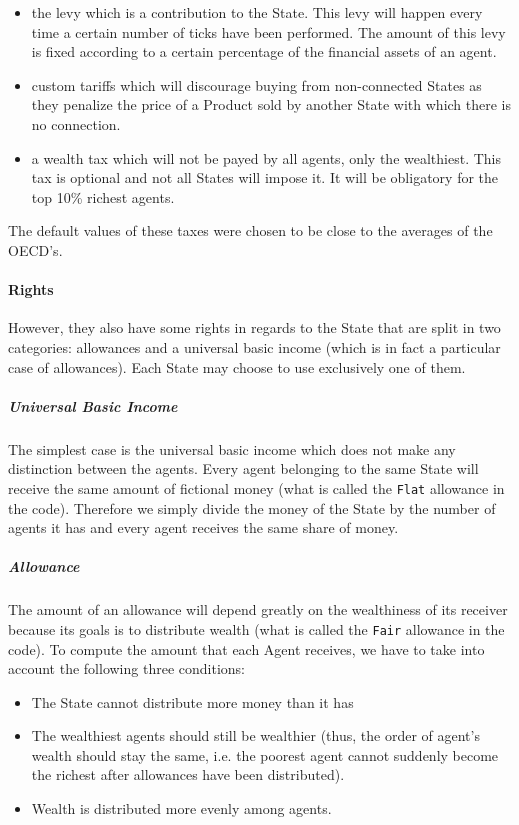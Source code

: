             \begin{itemize}
                \item the levy which is a contribution to the State. This levy will happen every time a certain number of ticks have been performed. The amount of this levy is fixed according to a certain percentage of the financial assets of an agent.
                \item custom tariffs which will discourage buying from non-connected States as they penalize the price of a Product sold by another State with which there is no connection.
                \item a wealth tax which will not be payed by all agents, only the wealthiest. This tax is optional and not all States will impose it. It will be obligatory for the top 10\% richest agents.
            \end{itemize}

            The default values of these taxes were chosen to be close to the averages of the OECD's.

        \paragraph{Rights}
            However, they also have some rights in regards to the State that are split in two categories: allowances and a universal basic income (which is in fact a particular case of allowances). Each State may choose to use exclusively one of them.

            \subparagraph{Universal Basic Income}
                The simplest case is the universal basic income which does not make any distinction between the agents. Every agent belonging to the same State will receive the same amount of fictional money (what is called the \texttt{Flat} allowance in the code). Therefore we simply divide the money of the State by the number of agents it has and every agent receives the same share of money.
            

            \subparagraph{Allowance}
                The amount of an allowance will depend greatly on the wealthiness of its receiver because its goals is to distribute wealth (what is called the \texttt{Fair} allowance in the code). To compute the amount that each Agent receives, we have to take into account the following three conditions:
                
                \begin{itemize}
                    \item The State cannot distribute more money than it has
                    \item The wealthiest agents should still be wealthier (thus, the order of agent's wealth should stay the same, i.e. the poorest agent cannot suddenly become the richest after allowances have been distributed). 
                    \item Wealth is distributed more evenly among agents.
                \end{itemize}


